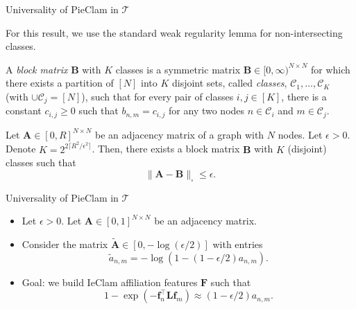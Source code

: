 \documentclass{beamer}
\begin{document}
\begin{frame}{Universality of PieClam in $\mathcal{T}$}


For this result, we use the standard weak regularity lemma for non-intersecting classes. 
\begin{definition}
    A \emph{block matrix} $\mathbf{B}$ with $K$ classes is a symmetric matrix $\mathbf{B}\in[0,\infty)^{N\times N}$ for which there exists a partition of $[N]$ into $K$ disjoint sets, called \emph{classes}, $\mathcal{C}_1,\ldots,\mathcal{C}_K$ (with $\cup\mathcal{C}_j=[N]$), such that for every pair of classes $i,j\in[K]$, there is a constant $c_{i,j}\geq 0$ such that  $b_{n,m}=c_{i,j}$ for any two nodes $n\in\mathcal{C}_i$ and $m\in\mathcal{C}_j$.
\end{definition}

\begin{theorem}
     Let $\mathbf{A}\in[0,R]^{N\times N}$ be an adjacency matrix of a graph with $N$ nodes. Let $\epsilon>0$. Denote $K=2^{2\lceil R^2/\epsilon^2\rceil}$.         Then, there exists a block matrix  $\mathbf{B}$ with $K$ (disjoint) classes such that 
    \begin{equation}
    \|\mathbf{A}-\mathbf{B}\|_{\square} \leq \epsilon.
    \end{equation}
    
\end{theorem}
\end{frame}

\begin{frame}{Universality of PieClam in $\mathcal{T}$}
\begin{itemize}
\item Let $\epsilon>0$. Let $\mathbf{A}\in[0,1]^{N\times N}$ be an adjacency matrix. 
\item Consider the matrix  $\tilde{\mathbf{A}}\in[0,-\log(\epsilon/2)]$ with entries
\[\tilde{a}_{n,m}=-\log(1-(1-\epsilon/2)a_{n,m}).\]
\item Goal: we build IeClam affiliation features $\mathbf{F}$  such that
\[1-\exp(-\mathbf{f}_n^{\top}\mathbf{L}\mathbf{f}_m)\approx (1-\epsilon/2)a_{n,m}.\]

\end{itemize}
\end{frame}
\end{document}
